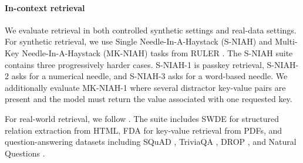 \paragraph{In-context retrieval}
We evaluate retrieval in both controlled synthetic settings and real-data settings. For synthetic retrieval, we use Single Needle-In-A-Haystack (S-NIAH) and Multi-Key Needle-In-A-Haystack (MK-NIAH) tasks from RULER \citep{hsieh2024ruler}. The S-NIAH suite contains three progressively harder cases. S-NIAH-1 is passkey retrieval, S-NIAH-2 asks for a numerical needle, and S-NIAH-3 asks for a word-based needle. We additionally evaluate MK-NIAH-1 where several distractor key-value pairs are present and the model must return the value associated with one requested key.

For real-world retrieval, we follow \citep{arora-2024-jrt}. The suite includes SWDE \citep{lockard_openceres_2019} for structured relation extraction from HTML, FDA \citep{arora_language_2023} for key-value retrieval from PDFs, and question-answering datasets including SQuAD \citep{rajpurkar_know_2018}, TriviaQA \citep{JoshiTriviaQA2017}, DROP \citep{dua2019drop}, and Natural Questions \citep{47761}.